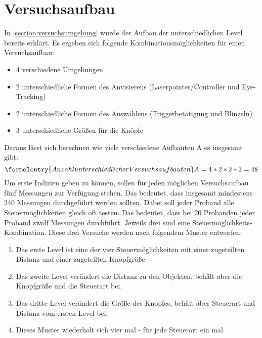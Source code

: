\section{Versuchsaufbau} 
In \autoref{section:versuchsumgebung} wurde der Aufbau der unterschiedlichen Level bereits erklärt. Es ergeben sich folgende Kombinationsmöglichkeiten für einen Versuchsaufbau:
\begin{itemize}
	\item 4 verschiedene Umgebungen
	\item 2 unterschiedliche Formen des Anvisierens (Laserpointer/Controller und Eye-Tracking)
	\item 2 unterschiedliche Formen des Auswählens (Triggerbetätigung und Blinzeln)
	\item 3 unterschiedliche Größen für die Knöpfe
\end{itemize}
Daraus lässt sich berechnen wie viele verschiedene Aufbauten A es insgesamt gibt:
\begin{equation}\formelentry{Anzahl unterschiedlicher Versuchsaufbauten}
	A=4*2*2*3=48
\end{equation}
Um erste Indizien geben zu können, sollen für jeden möglichen Versuchsaufbau fünf Messungen zur Verfügung stehen. Das bedeutet, dass insgesamt mindestens 240 Messungen durchgeführt werden sollten. Dabei soll jeder Proband alle Steuermöglichkeiten gleich oft testen. Das bedeutet, dass bei 20 Probanden jeder Proband zwölf Messungen durchführt. Jeweils drei sind eine Steuermöglichkeits-Kombination. Diese drei Versuche werden nach folgendem Muster entworfen:
\begin{enumerate}
	\item Das erste Level ist eine der vier Steuermöglichkeiten mit einer zugeteilten Distanz und einer zugeteilten Knopfgröße.
	\item Das zweite Level verändert die Distanz zu den Objekten, behält aber die Knopfgröße und die Steuerart bei.
	\item Das dritte Level verändert die Größe des Knopfes, behält aber Steuerart und Distanz vom ersten Level bei.
	\item Dieses Muster wiederholt sich vier mal - für jede Steuerart ein mal.
\end{enumerate}
